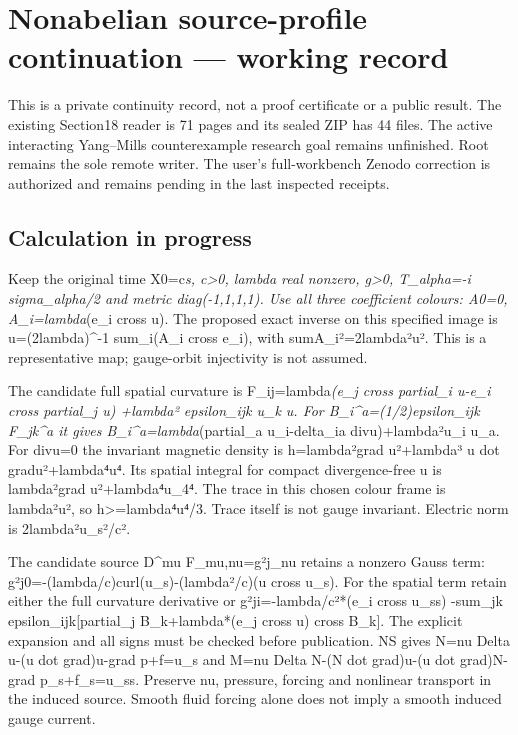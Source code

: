 \section{Nonabelian source-profile continuation --- working
record}\label{nonabelian-flow-continuity-md-nonabelian-source-profile-continuation-working-record}

This is a private continuity record, not a proof certificate or a public
result. The existing Section18 reader is 71 pages and its sealed ZIP has
44 files. The active interacting Yang--Mills counterexample research
goal remains unfinished. Root remains the sole remote writer. The user's
full-workbench Zenodo correction is authorized and remains pending in
the last inspected receipts.

\subsection{Calculation in progress}\label{nonabelian-flow-continuity-md-calculation-in-progress}

Keep the original time X0=c\emph{s, c\textgreater0, lambda real nonzero,
g\textgreater0, T\_alpha=-i sigma\_alpha/2 and metric diag(-1,1,1,1).
Use all three coefficient colours: A0=0, A\_i=lambda}(e\_i cross u). The
proposed exact inverse on this specified image is u=(2lambda)\^{}-1
sum\_i(A\_i cross e\_i), with
sum\textbar A\_i\textbar²=2lambda²\textbar u\textbar². This is a
representative map; gauge-orbit injectivity is not assumed.

The candidate full spatial curvature is F\_ij=lambda\emph{(e\_j cross
partial\_i u-e\_i cross partial\_j u) +lambda² epsilon\_ijk u\_k u. For
B\_i\^{}a=(1/2)epsilon\_ijk F\_jk\^{}a it gives
B\_i\^{}a=lambda}(partial\_a u\_i-delta\_ia divu)+lambda²u\_i u\_a. For
divu=0 the invariant magnetic density is h=lambda²\textbar grad
u\textbar²+lambda³ u dot
grad\textbar u\textbar²+lambda⁴\textbar u\textbar⁴. Its spatial integral
for compact divergence-free u is lambda²\textbar\textbar grad
u\textbar\textbar²+lambda⁴\textbar\textbar u\textbar\textbar\_4⁴. The
trace in this chosen colour frame is lambda²\textbar u\textbar², so
h\textgreater=lambda⁴\textbar u\textbar⁴/3. Trace itself is not gauge
invariant. Electric norm is 2lambda²\textbar u\_s\textbar²/c².

The candidate source D\^{}mu F\_mu,nu=g²j\_nu retains a nonzero Gauss
term: g²j0=-(lambda/c)curl(u\_s)-(lambda²/c)(u cross u\_s). For the
spatial term retain either the full curvature derivative or
g²ji=-lambda/c²*(e\_i cross u\_ss) -sum\_jk epsilon\_ijk{[}partial\_j
B\_k+lambda*(e\_j cross u) cross B\_k{]}. The explicit expansion and all
signs must be checked before publication. NS gives N=nu Delta u-(u dot
grad)u-grad p+f=u\_s and M=nu Delta N-(N dot grad)u-(u dot grad)N-grad
p\_s+f\_s=u\_ss. Preserve nu, pressure, forcing and nonlinear transport
in the induced source. Smooth fluid forcing alone does not imply a
smooth induced gauge current.

